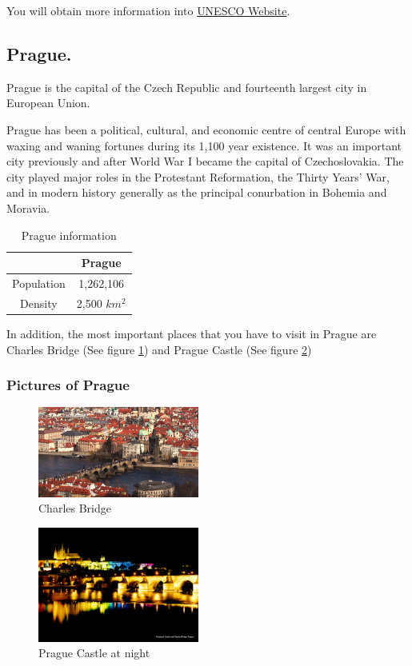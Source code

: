 \documentclass[a4paper, 12pt]{report}
\begin{document}
You will obtain more information into \href{unesco.org}{UNESCO Website}.


\newpage
	\subsection{Prague.} \label{praha}
	Prague is the capital of the Czech Republic and fourteenth largest city in European Union. 


	Prague has been a political, cultural, and economic centre of central Europe with waxing and waning fortunes during its 1,100 year existence. It was an important city previously and after World War I became the capital of Czechoslovakia. The city played major roles in the Protestant Reformation, the Thirty Years' War, and in modern history generally as the principal conurbation in Bohemia and Moravia.

	\begin{table}[h]
		\begin{center}	
		\begin{tabular}{|c|c|}
		\hline
		  & Prague \\
		\hline
		 Population & 1,262,106 \\
		\hline
		 Density & 2,500 $km^{2}$ \\
		\hline
		\end{tabular}
		\caption{Prague information}
		\end{center}
	\end{table}

	In addition, the most important places that you have to visit in Prague are Charles Bridge (See figure \ref{fig:bridge}) and Prague Castle (See figure \ref{fig:castle})


	\subsubsection{Pictures of Prague}
		\begin{figure}[h] %
			\centering
			\includegraphics[width=150pt]{prague.jpg}
			\caption{Charles Bridge}	%
			\label{fig:bridge}
		\end{figure}
		\begin{figure}[h] %
			\centering
			\includegraphics[width=150pt]{PragueCastleAtNight.jpg}
			\caption{\label{fig:castle}Prague Castle at night} 	%
			\label{fig:castle}
		\end{figure}
\end{document}
